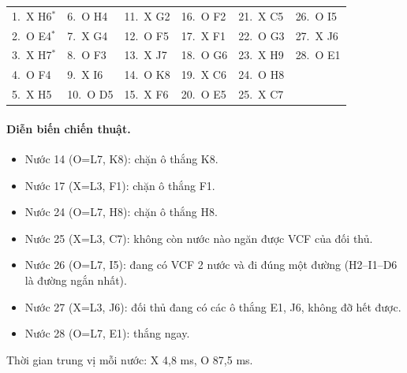 {\footnotesize\linespread{1}\selectfont
\noindent\begin{tabularx}{\linewidth}{*{6}{X}}
\toprule
1.~X H6$^\ast$ & 6.~O H4 & 11.~X G2 & 16.~O F2 & 21.~X C5 & 26.~O I5 \\
2.~O E4$^\ast$ & 7.~X G4 & 12.~O F5 & 17.~X F1 & 22.~O G3 & 27.~X J6 \\
3.~X H7$^\ast$ & 8.~O F3 & 13.~X J7 & 18.~O G6 & 23.~X H9 & 28.~O E1 \\
4.~O F4 & 9.~X I6 & 14.~O K8 & 19.~X C6 & 24.~O H8 &  \\
5.~X H5 & 10.~O D5 & 15.~X F6 & 20.~O E5 & 25.~X C7 &  \\
\bottomrule
\end{tabularx}\par}
\paragraph{Diễn biến chiến thuật.}
\begin{itemize}\footnotesize\linespread{1.1}\selectfont
\setlength{\itemsep}{0pt}
  \item Nước 14 (O=L7, K8): chặn ô thắng K8.
  \item Nước 17 (X=L3, F1): chặn ô thắng F1.
  \item Nước 24 (O=L7, H8): chặn ô thắng H8.
  \item Nước 25 (X=L3, C7): không còn nước nào ngăn được VCF của đối thủ.
  \item Nước 26 (O=L7, I5): đang có VCF 2 nước và đi đúng một đường (H2--I1--D6 là đường ngắn nhất).
  \item Nước 27 (X=L3, J6): đối thủ đang có các ô thắng E1, J6, không đỡ hết được.
  \item Nước 28 (O=L7, E1): thắng ngay.
\end{itemize}
Thời gian trung vị mỗi nước: X 4,8 ms, O 87,5 ms.
\clearpage

